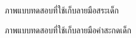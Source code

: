\documentclass[12pt,oneside,openright,a4paper]{cpe-thai-project}
\begin{document}
\begin{figure}[!ht]\centering
  \setlength{\fboxrule}{0.2mm} %
  \setlength{\fboxsep}{1cm}
  \caption{ภาพแบบทดสอบที่ใช้เก็บลายมือสระเด็ก}\label{fig:system}
    
\end{figure}
\begin{figure}[!ht]\centering
  \setlength{\fboxrule}{0.2mm} %
  \setlength{\fboxsep}{1cm}
  \caption{ภาพแบบทดสอบที่ใช้เก็บลายมือคำสะกดเด็ก}\label{fig:system}
    
\end{figure}





\nocite{*}


\end{document}
